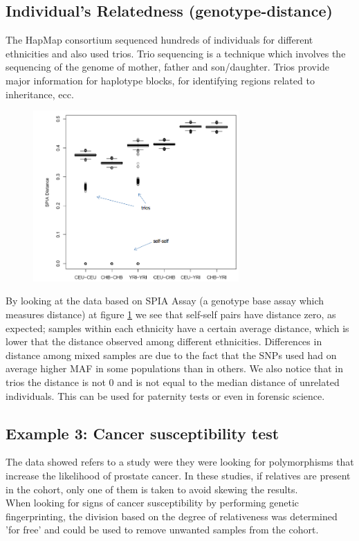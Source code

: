 \subsection{Individual's Relatedness (genotype-distance)}
The HapMap consortium sequenced hundreds of individuals for different ethnicities and also used trios. Trio sequencing is a technique which involves the sequencing of the genome of mother, father and son/daughter. Trios provide major information for haplotype blocks, for identifying regions related to inheritance, ecc.

\begin{figure}[H]
	\centering
	\includegraphics[width = 0.7\textwidth]{relatedness.PNG}
	\caption{\label{fig:trios}}
\end{figure}

By looking at the data based on SPIA Assay (a genotype base assay which measures distance) at figure \ref*{fig:trios} we see that self-self pairs have distance zero, as expected; samples within each ethnicity have a certain average distance, which is lower that the distance observed among different ethnicities. Differences in distance among mixed samples are due to the fact that the SNPs used had on average higher MAF in some populations than in others. We also notice that in trios the distance is not 0 and is not equal to the median distance of unrelated individuals. This can be used for paternity tests or even in forensic science.

\subsection{Example 3: Cancer susceptibility test}
The data showed refers to a study were they were looking for polymorphisms that increase the likelihood of prostate cancer. In these studies, if relatives are present in the cohort, only one of them is taken to avoid skewing the results. \\
When looking for signs of cancer susceptibility by performing genetic fingerprinting, the division based on the degree of relativeness was determined 'for free' and could be used to remove unwanted samples from the cohort.


